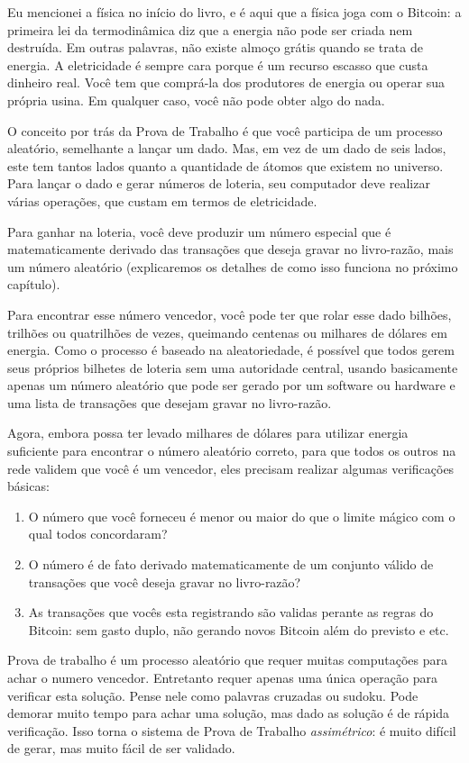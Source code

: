 Eu mencionei a física no início do livro, e é aqui que a física joga com o Bitcoin: a primeira lei da termodinâmica diz que a energia não pode ser criada nem destruída. Em outras palavras, não existe almoço grátis quando se trata de energia. A eletricidade é sempre cara porque é um recurso escasso que custa dinheiro real. Você tem que comprá-la dos produtores de energia ou operar sua própria usina. Em qualquer caso, você não pode obter algo do nada.

O conceito por trás da Prova de Trabalho é que você participa de um processo aleatório, semelhante a lançar um dado. Mas, em vez de um dado de seis lados, este tem tantos lados quanto a quantidade de átomos que existem no universo. Para lançar o dado e gerar números de loteria, seu computador deve realizar várias operações, que custam em termos de eletricidade.

Para ganhar na loteria, você deve produzir um número especial que é matematicamente derivado das transações que deseja gravar no livro-razão, mais um número aleatório (explicaremos os detalhes de como isso funciona no próximo capítulo).

Para encontrar esse número vencedor, você pode ter que rolar esse dado bilhões, trilhões ou quatrilhões de vezes, queimando centenas ou milhares de dólares em energia. Como o processo é baseado na aleatoriedade, é possível que todos gerem seus próprios bilhetes de loteria sem uma autoridade central, usando basicamente apenas um número aleatório que pode ser gerado por um software ou hardware e uma lista de transações que desejam gravar no livro-razão.

Agora, embora possa ter levado milhares de dólares para utilizar energia suficiente para encontrar o número aleatório correto, para que todos os outros na rede validem que você é um vencedor, eles precisam realizar algumas verificações básicas:

\begin{samepage}
\begin{enumerate}
\item O número que você forneceu é menor ou maior do que o limite mágico com o qual todos concordaram?
\item O número é de fato derivado matematicamente de um conjunto válido de transações que você deseja gravar no livro-razão?
\item As transações que vocês esta registrando são validas perante as regras do Bitcoin: sem gasto duplo, não gerando novos Bitcoin além do previsto e etc.
\end{enumerate}
\end{samepage}
Prova de trabalho é um processo aleatório que requer muitas computações para achar o numero vencedor. Entretanto requer apenas uma única operação para verificar esta solução. Pense nele como palavras cruzadas ou sudoku. Pode demorar muito tempo para achar uma solução, mas dado as solução é de rápida verificação.
Isso torna o sistema de Prova de Trabalho \textit{assimétrico}: é muito difícil de gerar, mas muito fácil de ser validado.

